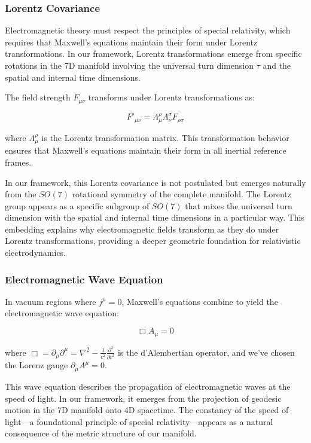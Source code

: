 \documentclass{article}
\begin{document}
\subsubsection{Lorentz Covariance}

Electromagnetic theory must respect the principles of special relativity, which requires that Maxwell's equations maintain their form under Lorentz transformations. In our framework, Lorentz transformations emerge from specific rotations in the 7D manifold involving the universal turn dimension $\tau$ and the spatial and internal time dimensions.

The field strength $F_{\mu\nu}$ transforms under Lorentz transformations as:

\begin{equation}
F'_{\mu\nu} = \Lambda^{\rho}_{\mu}\Lambda^{\sigma}_{\nu}F_{\rho\sigma}
\end{equation}

where $\Lambda^{\rho}_{\mu}$ is the Lorentz transformation matrix. This transformation behavior ensures that Maxwell's equations maintain their form in all inertial reference frames.

In our framework, this Lorentz covariance is not postulated but emerges naturally from the $SO(7)$ rotational symmetry of the complete manifold. The Lorentz group appears as a specific subgroup of $SO(7)$ that mixes the universal turn dimension with the spatial and internal time dimensions in a particular way. This embedding explains why electromagnetic fields transform as they do under Lorentz transformations, providing a deeper geometric foundation for relativistic electrodynamics.

\subsubsection{Electromagnetic Wave Equation}

In vacuum regions where $j^{\mu} = 0$, Maxwell's equations combine to yield the electromagnetic wave equation:

\begin{equation}
\Box A_{\mu} = 0
\end{equation}

where $\Box = \partial_{\mu}\partial^{\mu} = \nabla^2 - \frac{1}{c^2}\frac{\partial^2}{\partial t^2}$ is the d'Alembertian operator, and we've chosen the Lorenz gauge $\partial_{\mu}A^{\mu} = 0$.

This wave equation describes the propagation of electromagnetic waves at the speed of light. In our framework, it emerges from the projection of geodesic motion in the 7D manifold onto 4D spacetime. The constancy of the speed of light—a foundational principle of special relativity—appears as a natural consequence of the metric structure of our manifold.
\end{document}
